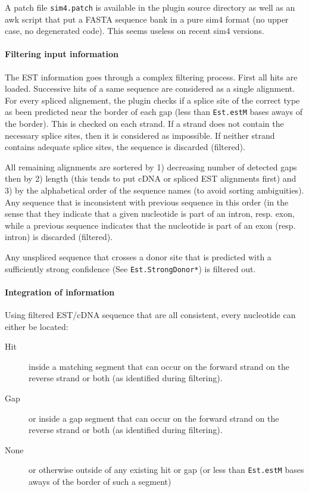 A patch file \texttt{sim4.patch} is available in the plugin source
directory as well as an awk script that put a FASTA sequence bank in a
pure sim4 format (no upper case, no degenerated code). This seems
useless on recent sim4 versions.

\paragraph{Filtering input information}

The EST information goes through a complex filtering process. First
all hits are loaded. Successive hits of a same sequence are considered
as a single alignment.  For every spliced alignement, the plugin
checks if a splice site of the correct type as been predicted near the
border of each gap (less than \texttt{Est.estM} bases aways of the
border). This is checked on each strand. If a strand does not contain
the necessary splice sites, then it is considered as impossible. If
neither strand contains adequate splice sites, the sequence is
discarded (filtered).

All remaining alignments are sortered by 1) decreasing number of
detected gaps then by 2) length (this tends to put cDNA or spliced EST
alignments first) and 3) by the alphabetical order of the sequence
names (to avoid sorting ambiguities). Any sequence that is
inconsistent with previous sequence in this order (in the sense that
they indicate that a given nucleotide is part of an intron, resp.
exon, while a previous sequence indicates that the nucleotide is part
of an exon (resp. intron) is discarded (filtered).

Any unspliced sequence that crosses a donor site that is predicted
with a sufficiently strong confidence (See \texttt{Est.StrongDonor*})
is filtered out.

\paragraph{Integration of information}

Using filtered EST/cDNA sequence that are all consistent, every
nucleotide can either be located:
\begin{description}
\item[Hit] inside a matching segment that can occur on the forward strand
  on the reverse strand or both (as identified during filtering).
\item[Gap] or inside a gap segment that can occur on the forward strand
  on the reverse strand or both (as identified during filtering).
\item[None] or otherwise outside of any existing hit or gap (or less
  than \texttt{Est.estM} bases aways of the border of such a segment)
\end{description}

